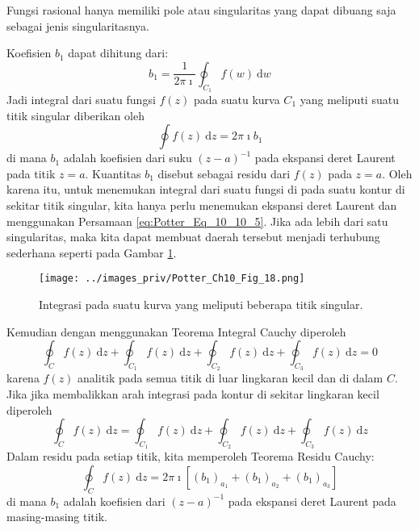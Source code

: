 Fungsi rasional hanya memiliki pole atau singularitas yang dapat dibuang
saja sebagai jenis singularitasnya.

Koefisien $b_{1}$ dapat dihitung dari:
\begin{equation*}
b_{1} = \frac{1}{2\pi\imath}\oint_{C_{1}}f(w)\ \mathrm{d}w
\end{equation*}
Jadi integral dari suatu fungsi $f(z)$ pada suatu kurva $C_{1}$
yang meliputi suatu titik singular diberikan oleh
\begin{equation*}
\oint f(z)\ \mathrm{d}z=2\pi\imath b_{1}
\label{eq:Potter_Eq_10_10_5}
\end{equation*}
di mana $b_{1}$ adalah koefisien dari suku $(z-a)^{-1}$ pada ekspansi
deret Laurent pada titik $z=a$. Kuantitas $b_{1}$ disebut sebagai
residu dari $f(z)$ pada $z=a$. Oleh karena itu, untuk menemukan
integral dari suatu fungsi di pada suatu kontur di sekitar titik singular,
kita hanya perlu menemukan ekspansi deret Laurent dan menggunakan
Persamaan \ref{eq:Potter_Eq_10_10_5}.
Jika ada lebih dari satu singularitas, maka kita dapat
membuat daerah tersebut menjadi terhubung sederhana seperti pada Gambar
\ref{eq:Potter_Ch10_Fig_18}.
%
\begin{figure}[h]
{\centering
\texttt{[image: ../images\_priv/Potter\_Ch10\_Fig\_18.png]}
\par}
\caption{Integrasi pada suatu kurva yang meliputi beberapa titik singular.}
\label{eq:Potter_Ch10_Fig_18}
\end{figure}
%
Kemudian dengan menggunakan Teorema Integral Cauchy diperoleh
\begin{equation*}
\oint_{C}f(z)\ \mathrm{d}z+\oint_{C_{1}}f(z)\ \mathrm{d}z+\oint_{C_{2}}f(z)\ \mathrm{d}z +
\oint_{C_{3}}f(z)\ \mathrm{d}z=0
\end{equation*}
karena $f(z)$ analitik pada semua titik di luar lingkaran kecil dan
di dalam $C$. Jika jika membalikkan arah integrasi pada kontur di
sekitar lingkaran kecil diperoleh
\begin{equation*}
\oint_{C}f(z)\ \mathrm{d}z=\oint_{C_{1}}f(z)\ \mathrm{d}z + 
\oint_{C_{2}}f(z)\ \mathrm{d}z + \oint_{C_{3}}f(z)\ \mathrm{d}z
\end{equation*}
Dalam residu pada setiap titik, kita memperoleh Teorema Residu Cauchy:
\begin{equation*}
\oint_{C}f(z)\ \mathrm{d}z = 2\pi\imath\left[\left(b_{1}\right)_{a_{1}} + \left(b_{1}\right)_{a_{2}} +
\left(b_{1}\right)_{a_{3}}\right]
\end{equation*}
di mana $b_{1}$ adalah koefisien dari $(z-a)^{-1}$ pada ekspansi
deret Laurent pada masing-masing titik.

